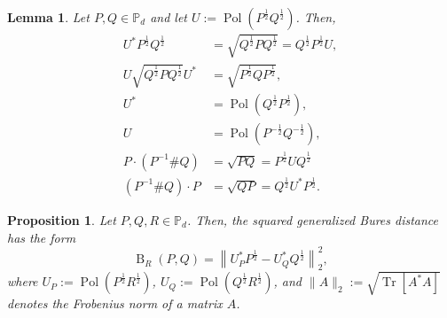 \documentclass[10pt,a4paper]{amsart}
\newtheorem{prop}{Proposition}
\newtheorem{lemma}{Lemma}
\begin{document}
    \begin{lemma}\label{Lem:PolarFactorLemma}
Let $P, Q \in \mathbb{P}_d$ and let $U := \operatorname{Pol}\left(P^{\frac 12} Q^{\frac 12}\right)$. Then,
\begin{align}
    U^* P^{\frac 12} Q^{\frac 12} &= \sqrt{Q^{\frac 12} P Q^{\frac 12}} = Q^{\frac 12} P^{\frac 12} U, \label{Eq:PolFacLemma1} \\
    U \sqrt{Q^{\frac 12} P Q^{\frac 12}} U^* &= \sqrt{P^{\frac 12} Q P^{\frac 12}}, \label{Eq:PolFacLemma2} \\
    U^* &= \operatorname{Pol}\left(Q^{\frac 12} P^{\frac 12}\right), \\
    U &= \operatorname{Pol}\left(P^{-\frac 12} Q^{-\frac 12}\right), \\
    P \cdot (P^{-1} \# Q) &= \sqrt{PQ} = P^{\frac 12} U Q^{\frac 12} \\  
     (P^{-1} \# Q) \cdot P &= \sqrt{QP} = Q^{\frac 12} U^* P^{\frac 12} .
\end{align}
\end{lemma}

\begin{prop} \label{Thm:GBRAlternativeForm}
    Let $P,Q,R \in \mathbb P_d$. Then, the squared generalized Bures distance has the form 
    \begin{equation}
        \operatorname{B}_R(P,Q) = \left\| U^*_P P^{\frac12}  - U^*_Q Q ^{\frac12} \right\|_2^2,
    \end{equation}
    where $U_P := \operatorname{Pol}\left(P^{\frac12}  R ^{\frac12} \right)$, $U_Q := \operatorname{Pol}\left(Q ^{\frac12} R ^{\frac12} \right)$, and $\|A\|_2 := \sqrt{\operatorname{Tr}[A^*A]}$ denotes the Frobenius norm of a matrix $A$. 
\end{prop}
\end{document}
